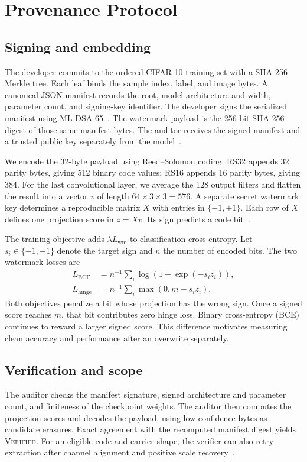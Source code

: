 \section{Provenance Protocol}
\subsection{Signing and embedding}
The developer commits to the ordered CIFAR-10 training set with a SHA-256 Merkle tree. Each leaf binds the sample index, label, and image bytes. A canonical JSON manifest records the root, model architecture and width, parameter count, and signing-key identifier. The developer signs the serialized manifest using ML-DSA-65~\cite{nist204}. The watermark payload is the 256-bit SHA-256 digest of those same manifest bytes. The auditor receives the signed manifest and a trusted public key separately from the model~\cite{projectResults}.

We encode the 32-byte payload using Reed--Solomon coding. RS32 appends 32 parity bytes, giving 512 binary code values; RS16 appends 16 parity bytes, giving 384. For the last convolutional layer, we average the 128 output filters and flatten the result into a vector $v$ of length $64\times3\times3=576$. A separate secret watermark key determines a reproducible matrix $X$ with entries in $\{-1,+1\}$. Each row of $X$ defines one projection score in $z=Xv$. Its sign predicts a code bit~\cite{uchida2017embedding,projectResults}.

The training objective adds $\lambda L_{\mathrm{wm}}$ to classification cross-entropy. Let $s_i\in\{-1,+1\}$ denote the target sign and $n$ the number of encoded bits. The two watermark losses are
\begin{align}
L_{\mathrm{BCE}} &= n^{-1}\sum_i \log(1+\exp(-s_i z_i)),\\
L_{\mathrm{hinge}} &= n^{-1}\sum_i \max(0,m-s_i z_i).
\end{align}
Both objectives penalize a bit whose projection has the wrong sign. Once a signed score reaches $m$, that bit contributes zero hinge loss. Binary cross-entropy (BCE) continues to reward a larger signed score. This difference motivates measuring clean accuracy and performance after an overwrite separately.

\subsection{Verification and scope}
The auditor checks the manifest signature, signed architecture and parameter count, and finiteness of the checkpoint weights. The auditor then computes the projection scores and decodes the payload, using low-confidence bytes as candidate erasures. Exact agreement with the recomputed manifest digest yields \textsc{Verified}. For an eligible code and carrier shape, the verifier can also retry extraction after channel alignment and positive scale recovery~\cite{projectResults}.

